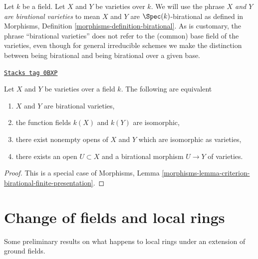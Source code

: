 Let $k$ be a field. Let $X$ and $Y$ be varieties over $k$.
We will use the phrase {\it $X$ and $Y$ are birational varieties}
to mean $X$ and $Y$ are $\Spec(k)$-birational
as defined in Morphisms, Definition \ref{morphisms-definition-birational}.
As is customary, the phrase ``birational varieties''
does not refer to the (common) base field of the varieties,
even though for general irreducible schemes we make the distinction between
being birational and being birational over a given base.

\begin{lemma}
\label{varieties-lemma-birational-varieties}
\href{https://stacks.math.columbia.edu/tag/0BXP}{\texttt{Stacks tag 0BXP}}

Let $X$ and $Y$ be varieties over a field $k$.
The following are equivalent
\begin{enumerate}
\item $X$ and $Y$ are birational varieties,
\item the function fields $k(X)$ and $k(Y)$ are isomorphic,
\item there exist nonempty opens of $X$ and $Y$ which are isomorphic
as varieties,
\item there exists an open $U \subset X$ and a birational morphism
$U \to Y$ of varieties.
\end{enumerate}
\end{lemma}

\begin{proof}
This is a special case of
Morphisms, Lemma \ref{morphisms-lemma-criterion-birational-finite-presentation}.
\end{proof}

\section{Change of fields and local rings}
\label{varieties-section-local-rings}
Some preliminary results on what happens to local rings under
an extension of ground fields.

